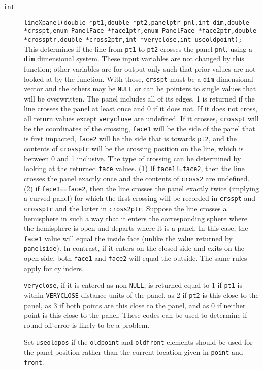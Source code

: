 \documentclass {book}
\newcommand {\ttt} {\texttt}
\begin{document}
\begin{description}
\item[\ttt{int}]
\ttt{lineXpanel(double *pt1,double *pt2,panelptr pnl,int dim,double *crsspt,enum PanelFace *face1ptr,enum PanelFace *face2ptr,double *crossptr,double *cross2ptr,int *veryclose,int useoldpoint);}
\hfill \\
This determines if the line from \ttt{pt1} to \ttt{pt2} crosses the panel \ttt{pnl}, using a \ttt{dim} dimensional system. These input variables are not changed by this function; other variables are for output only such that prior values are not looked at by the function. With those, \ttt{crsspt} must be a \ttt{dim} dimensional vector and the others may be \ttt{NULL} or can be pointers to single values that will be overwritten. The panel includes all of its edges. 1 is returned if the line crosses the panel at least once and 0 if it does not. If it does not cross, all return values except \ttt{veryclose} are undefined. If it crosses, \ttt{crosspt} will be the coordinates of the crossing, \ttt{face1} will be the side of the panel that is first impacted, \ttt{face2} will be the side that is towards \ttt{pt2}, and the contents of \ttt{crossptr} will be the crossing position on the line, which is between 0 and 1 inclusive. The type of crossing can be determined by looking at the returned \ttt{face} values. (1) If \ttt{face1!=face2}, then the line crosses the panel exactly once and the contents of \ttt{cross2} are undefined. (2) if \ttt{face1==face2}, then the line crosses the panel exactly twice (implying a curved panel) for which the first crossing will be recorded in \ttt{crsspt} and \ttt{crossptr} and the latter in \ttt{cross2ptr}. Suppose the line crosses a hemisphere in such a way that it enters the corresponding sphere where the hemisphere is open and departs where it is a panel. In this case, the \ttt{face1} value will equal the inside face (unlike the value returned by \ttt{panelside}). In contrast, if it enters on the closed side and exits on the open side, both \ttt{face1} and \ttt{face2} will equal the outside. The same rules apply for cylinders.

\ttt{veryclose}, if it is entered as non-\ttt{NULL}, is returned equal to 1 if \ttt{pt1} is within \ttt{VERYCLOSE} distance units of the panel, as 2 if \ttt{pt2} is this close to the panel, as 3 if both points are this close to the panel, and as 0 if neither point is this close to the panel. These codes can be used to determine if round-off error is likely to be a problem.

Set \ttt{useoldpos} if the \ttt{oldpoint} and \ttt{oldfront} elements should be used for the panel position rather than the current location given in \ttt{point} and \ttt{front}.


\end{description}
\end{document}
